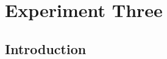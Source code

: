 \documentclass[doc,apacite]{apa6}
\begin{document}
%


\section{Experiment Three}

\subsection{Introduction}
\end{document}
